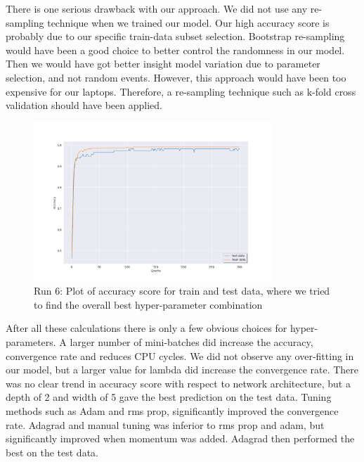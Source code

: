 There is one serious drawback with our approach. We did not use any re-sampling
technique when we trained our model. Our high accuracy score is probably due to
our specific train-data subset selection. Bootstrap re-sampling would have been
a good choice to better control the randomness in our model. Then we would have
got better insight model variation due to parameter selection, and not random
events. However, this approach would have been too expensive for our
laptops. Therefore, a re-sampling technique such as k-fold cross validation
should have been applied.  


\begin{figure}[H]
    \centering
    \includegraphics[width=0.8\textwidth]{Figures/PartD/d_line_best.png}
    \caption{Run 6: Plot of accuracy score for train and test data, where we
    tried to find the overall best hyper-parameter combination}  
    \label{fig:d_line_best} 
\end{figure}


After all these calculations there is only a few obvious choices for
hyper-parameters. A larger number of mini-batches did increase the accuracy,
convergence rate and reduces CPU cycles. We did not observe any over-fitting in 
our model, but a larger value for lambda did increase the convergence rate.
There was no clear trend in accuracy score with respect to network
architecture, but a depth of 2 and width of 5 gave the best prediction on the
test data. Tuning methods such as Adam and rms prop, significantly improved the
convergence rate. Adagrad and manual tuning was inferior to rms prop and adam,
but significantly improved when momentum was added. Adagrad then performed the
best on the test data. 


                            

